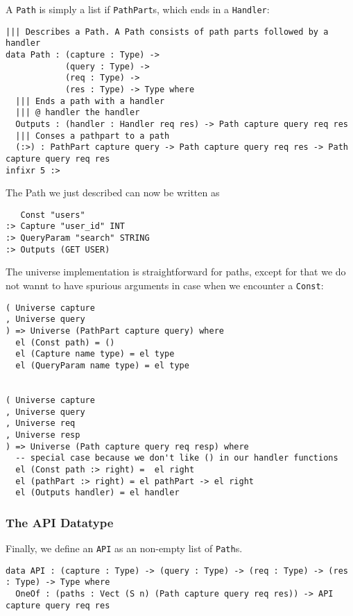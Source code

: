 \documentclass[12pt,a4paper]{article}
\begin{document}
A \texttt{Path} is simply a list if \texttt{PathPart}s, which ends in a \texttt{Handler}:
\begin{verbatim}
||| Describes a Path. A Path consists of path parts followed by a handler
data Path : (capture : Type) -> 
            (query : Type) ->
            (req : Type) ->
            (res : Type) -> Type where
  ||| Ends a path with a handler
  ||| @ handler the handler
  Outputs : (handler : Handler req res) -> Path capture query req res
  ||| Conses a pathpart to a path
  (:>) : PathPart capture query -> Path capture query req res -> Path capture query req res
infixr 5 :>
\end{verbatim}

The Path we just described can now be written as
\begin{verbatim}
   Const "users"
:> Capture "user_id" INT
:> QueryParam "search" STRING
:> Outputs (GET USER)
\end{verbatim}

The universe implementation is straightforward for paths, except for
that we do not wannt to have spurious arguments in case when we encounter
a \texttt{Const}:
\begin{verbatim}
( Universe capture
, Universe query
) => Universe (PathPart capture query) where
  el (Const path) = ()
  el (Capture name type) = el type
  el (QueryParam name type) = el type


( Universe capture
, Universe query
, Universe req
, Universe resp
) => Universe (Path capture query req resp) where
  -- special case because we don't like () in our handler functions
  el (Const path :> right) =  el right
  el (pathPart :> right) = el pathPart -> el right
  el (Outputs handler) = el handler
\end{verbatim}

\subsubsection{The API Datatype}
Finally, we define an \texttt{API} as an non-empty list of \texttt{Path}s.

\begin{verbatim}
data API : (capture : Type) -> (query : Type) -> (req : Type) -> (res : Type) -> Type where
  OneOf : (paths : Vect (S n) (Path capture query req res)) -> API capture query req res
\end{verbatim}
\end{document}
